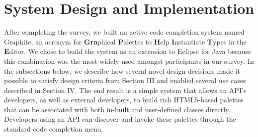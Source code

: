 \documentclass[10pt, conference, compsocconf]{IEEEtran}
\begin{document}
%
%
%
%
%
%
%
\section{System Design and Implementation}
After completing the survey, we built an active code completion system named Graphite, an acronym for {\bf Gra}phical {\bf P}alettes to {\bf H}elp {\bf I}nstantiate {\bf T}ypes in the {\bf E}ditor. 
We chose to build the system as an extension to Eclipse for Java because this combination was the most widely-used  amongst participants in our survey. In the subsections below, we describe how several novel design decisions made it possible to satisfy design criteria from Section III and enabled several use cases described in Section IV. The end result is a simple system that allows an API's developers, as well as external developers, to build rich HTML5-based palettes that can be associated with both in-built and user-defined classes directly. Developers using an API can discover and invoke these palettes through the standard code completion menu.
\end{document}

